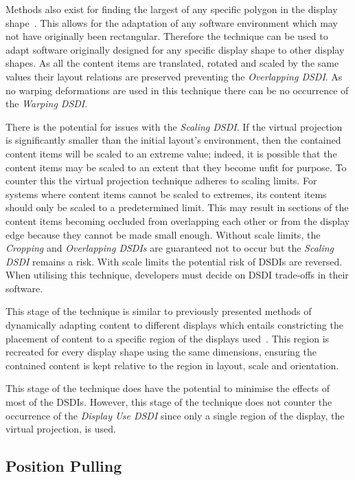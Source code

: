\documentclass[review,5p,times,twocolumn]{elsarticle}
\begin{document}
Methods also exist for finding the largest of any specific polygon in the display shape~\cite{Toussaint1983}.
This allows for the adaptation of any software environment which may not have originally been rectangular.
Therefore the technique can be used to adapt software originally designed for any specific display shape to other display shapes.
As all the content items are translated, rotated and scaled by the same values their layout relations are preserved preventing the {\emph{Overlapping \ac{DSDI}}}.
As no warping deformations are used in this technique there can be no occurrence of the {\emph{Warping \ac{DSDI}}}.

There is the potential for issues with the {\emph{Scaling \ac{DSDI}}}.
If the virtual projection is significantly smaller than the initial
layout's environment, then the contained content items will be scaled to an extreme value; indeed, it is possible that the content items may be scaled to an extent that they become unfit for purpose.
To counter this the virtual projection technique adheres to scaling limits.
For systems where content items cannot be scaled to extremes, its content items should only be scaled to a predetermined limit.
This may result in sections of the content items becoming occluded from overlapping each other or from the display edge because they cannot be made small enough.
Without scale limits, the {\emph{Cropping}} and {\emph{Overlapping \acp{DSDI}}} are guaranteed not to occur but the {\emph{Scaling \ac{DSDI}}} remains a risk.
With scale limits the potential risk of \acp{DSDI} are reversed.
When utilising this technique, developers must decide on \ac{DSDI} trade-offs in their software.

This stage of the technique is similar to previously presented methods of dynamically adapting content to different displays which entails constricting the placement of content to a specific region of the displays used~\cite{Cotting2006,Raskar2003}.
This region is recreated for every display shape using the same dimensions, ensuring the contained content is kept relative to the region in layout, scale and orientation.

This stage of the technique does have the potential to minimise the effects of most of the \acp{DSDI}.
However, this stage of the technique does not counter the occurrence of the {\emph{Display Use \ac{DSDI}}} since only a single region of the display, the virtual projection, is used.

\subsection{Position Pulling}
\label{subsec:positionpulling} 
\end{document}
